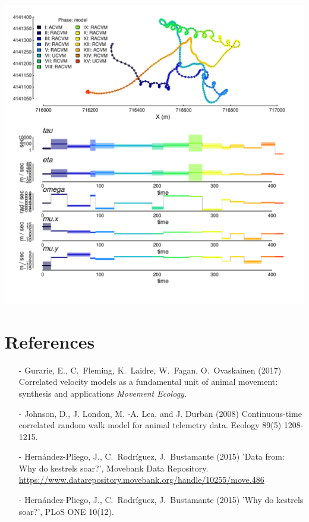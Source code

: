 \documentclass[10pt]{article}\usepackage[]{graphicx}\usepackage[]{color}
\makeatletter
\def\maxwidth{ %
  \ifdim\Gin@nat@width>\linewidth
    \linewidth
  \else
    \Gin@nat@width
  \fi
}
\newenvironment{kframe}{%
 \def\at@end@of@kframe{}%
 \ifinner\ifhmode%
  \def\at@end@of@kframe{\end{minipage}}%
  \begin{minipage}{\columnwidth}%
 \fi\fi%
 \def\FrameCommand##1{\hskip\@totalleftmargin \hskip-\fboxsep
 \colorbox{shadecolor}{##1}\hskip-\fboxsep
     \hskip-\linewidth \hskip-\@totalleftmargin \hskip\columnwidth}%
 \MakeFramed {\advance\hsize-\width
   \@totalleftmargin\z@ \linewidth\hsize
   \@setminipage}}%
 {\par\unskip\endMakeFramed%
 \at@end@of@kframe}
\newenvironment{knitrout}{}{} %
\makeatother
\begin{document}
\begin{knitrout}
\begin{kframe}
{\ttfamily\noindent\bfseries{}}\end{kframe}
\includegraphics[width=\maxwidth]{figure/kestrelMegaPlot-1} 

\end{knitrout}


\noindent 


\section*{References}

\begin{itemize}

\item[-] Gurarie, E., C.~Fleming, K.~Laidre, W.~Fagan, O.~Ovaskainen (2017) Correlated velocity models as a fundamental unit of animal movement: synthesis and applications \emph{Movement Ecology}. 
\item[-] Johnson, D., J. London, M. -A. Lea, and J. Durban (2008) Continuous-time correlated random walk model for animal telemetry data. Ecology 89(5) 1208-1215.
\item[-] Hern{\'a}ndez-Pliego, J., C.~Rodr{\'i}guez, J.~Bustamante (2015) 'Data from: Why do kestrels soar?', Movebank Data Repository. \url{https://www.datarepository.movebank.org/handle/10255/move.486}
\item[-] Hern{\'a}ndez-Pliego, J., C.~Rodr{\'i}guez, J.~Bustamante (2015) 'Why do kestrels soar?', PLoS ONE 10(12).

\end{itemize}
\end{document}
